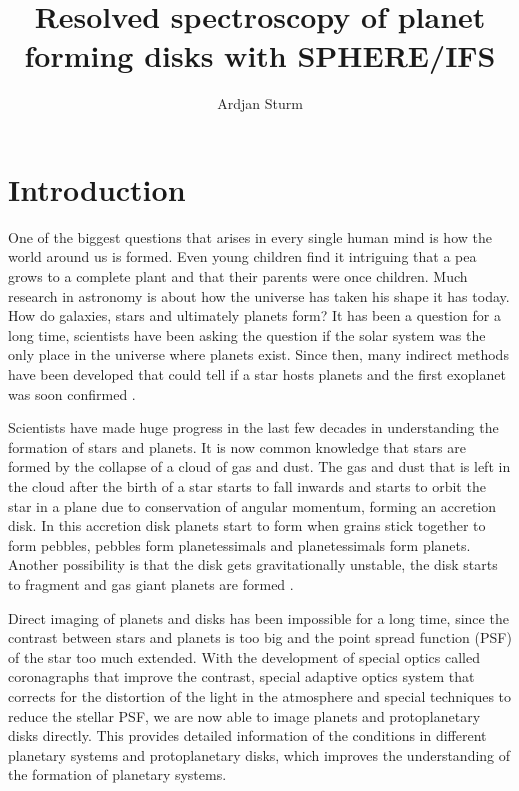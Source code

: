 \documentclass[twoside,single,12pt]{lion-msc}
\title{Resolved spectroscopy of planet forming disks with SPHERE/IFS}
\author{Ardjan Sturm}
\affiliation{Huygens-Kamerlingh Onnes Laboratory, Leiden University}   %
\begin{document}

\maketitle

\tableofcontents
\cleardoublepage



\chapter{Introduction}
One of the biggest questions that arises in every single human mind is how the world around us is formed. Even young children find it intriguing that a pea grows to a complete plant and that their parents were once children. Much research in astronomy is about how the universe has taken his shape it has today. How do galaxies, stars and ultimately planets form? It has been a question for a long time, scientists have been asking the question if the solar system was the only place in the universe where planets exist. Since then, many indirect methods have been developed that could tell if a star hosts planets and the first exoplanet was soon confirmed \cite{Mayor1995}.
\bigskip

Scientists have made huge progress in the last few decades in understanding the formation of stars and planets. It is now common knowledge that stars are formed by the collapse of a cloud of gas and dust. The gas and dust that is left in the cloud after the birth of a star starts to fall inwards and starts to orbit the star in a plane due to conservation of angular momentum, forming an accretion disk. In this accretion disk planets start to form when grains stick together to form pebbles, pebbles form planetessimals and planetessimals form planets. Another possibility is that the disk gets gravitationally unstable, the disk starts to fragment and gas giant planets are formed \cite{Armitage2010}.
\bigskip

Direct imaging of planets and disks has been impossible for a long time, since the contrast between stars and planets is too big and the point spread function (PSF) of the star too much extended. With the development of special optics called coronagraphs that improve the contrast, special adaptive optics system that corrects for the distortion of the light in the atmosphere and special techniques to reduce the stellar PSF, we are now able to image planets and protoplanetary disks directly. This provides detailed information of the conditions in different planetary systems and protoplanetary disks, which improves the understanding of the formation of planetary systems.
\bigskip
\end{document}
